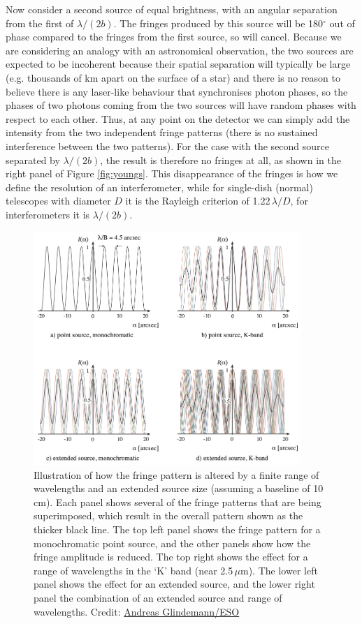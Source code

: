 \documentclass[11pt]{article}
\begin{document}
Now consider a second source of equal brightness, with an angular separation from the first of $\lambda/(2b)$. The fringes produced by this source will be 180$^\circ$ out of phase compared to the fringes from the first source, so will cancel. Because we are considering an analogy with an astronomical observation, the two sources are expected to be incoherent because their spatial separation will typically be large (e.g. thousands of km apart on the surface of a star) and there is no reason to believe there is any laser-like behaviour that synchronises photon phases, so the phases of two photons coming from the two sources will have random phases with respect to each other. Thus, at any point on the detector we can simply add the intensity from the two independent fringe patterns (there is no sustained interference between the two patterns). For the case with the second source separated by $\lambda/(2b)$, the result is therefore no fringes at all, as shown in the right panel of Figure \ref{fig:youngs}. This disappearance of the fringes is how we define the resolution of an interferometer, while for single-dish (normal) telescopes with diameter $D$ it is the Rayleigh criterion of 1.22\,$\lambda/D$, for interferometers it is $\lambda/(2b)$.

\begin{figure}[h!]
    \centering
    \includegraphics[width=0.9\textwidth]{doc/coherence.png}
    \caption{Illustration of how the fringe pattern is altered by a finite range of wavelengths and an extended source size (assuming a baseline of 10\,cm). Each panel shows several of the fringe patterns that are being superimposed, which result in the overall pattern shown as the thicker black line. The top left panel shows the fringe pattern for a monochromatic point source, and the other panels show how the fringe amplitude is reduced. The top right shows the effect for a range of wavelengths in the `K' band (near 2.5\,$\mu$m). The lower left panel shows the effect for an extended source, and the lower right panel the combination of an extended source and range of wavelengths. Credit: \href{https://www.eso.org/sci/facilities/paranal/telescopes/vlti/tuto/tutorial_spatial_interferometry.pdf}{Andreas Glindemann/ESO}}
    \label{fig:coherence}
\end{figure}
\end{document}
